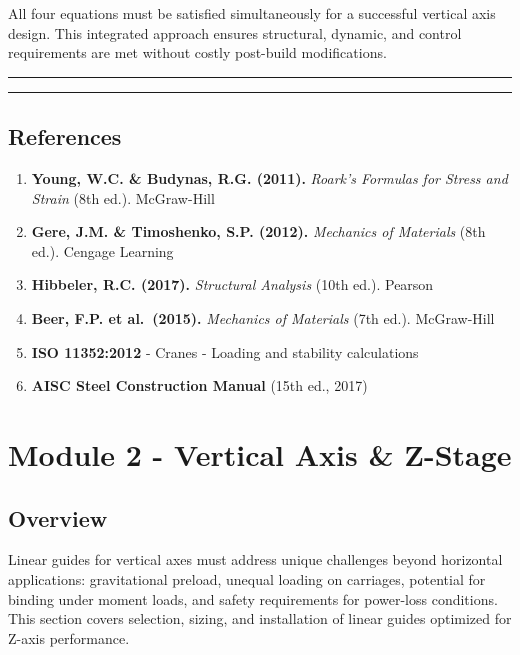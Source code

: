 \documentclass[
]{article}
\providecommand{\tightlist}{%
  \setlength{\itemsep}{0pt}\setlength{\parskip}{0pt}}
\begin{document}
All four equations must be satisfied simultaneously for a successful
vertical axis design. This integrated approach ensures structural,
dynamic, and control requirements are met without costly post-build
modifications.

\begin{center}\rule{0.5\linewidth}{0.5pt}\end{center}

\begin{center}\rule{0.5\linewidth}{0.5pt}\end{center}

\subsection{References}\label{references-2}

\begin{enumerate}
\def\labelenumi{\arabic{enumi}.}
\tightlist
\item
  \textbf{Young, W.C. \& Budynas, R.G. (2011).} \emph{Roark's Formulas
  for Stress and Strain} (8th ed.). McGraw-Hill
\item
  \textbf{Gere, J.M. \& Timoshenko, S.P. (2012).} \emph{Mechanics of
  Materials} (8th ed.). Cengage Learning
\item
  \textbf{Hibbeler, R.C. (2017).} \emph{Structural Analysis} (10th ed.).
  Pearson
\item
  \textbf{Beer, F.P. et al.~(2015).} \emph{Mechanics of Materials} (7th
  ed.). McGraw-Hill
\item
  \textbf{ISO 11352:2012} - Cranes - Loading and stability calculations
\item
  \textbf{AISC Steel Construction Manual} (15th ed., 2017)
\end{enumerate}

\newpage

\section{Module 2 - Vertical Axis \&
Z-Stage}\label{module-2---vertical-axis-z-stage-3}

\subsection{Overview}\label{overview-2}

Linear guides for vertical axes must address unique challenges beyond
horizontal applications: gravitational preload, unequal loading on
carriages, potential for binding under moment loads, and safety
requirements for power-loss conditions. This section covers selection,
sizing, and installation of linear guides optimized for Z-axis
performance.
\end{document}

